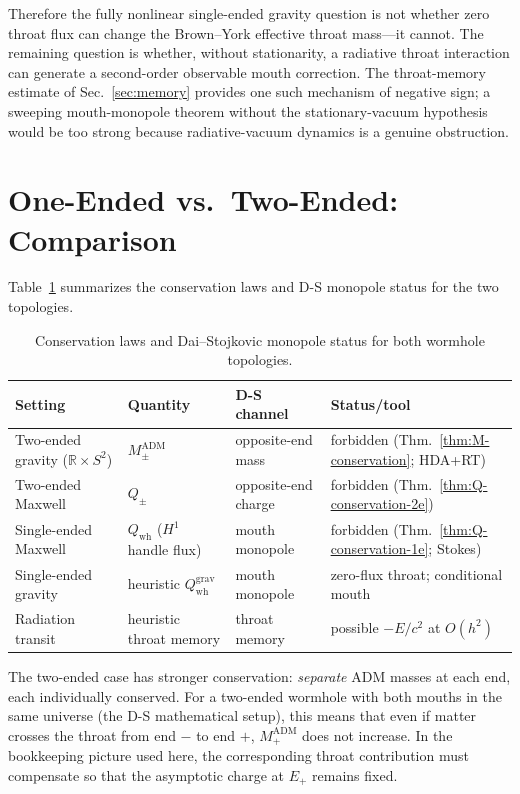 \documentclass[aps,prd,onecolumn,nofootinbib,superscriptaddress]{revtex4-2}
\begin{document}
Therefore the fully nonlinear single-ended gravity question is not whether
zero throat flux can change the Brown--York effective throat mass---it cannot.
The remaining question is whether, without stationarity, a radiative throat
interaction can generate a second-order observable mouth correction.  The
throat-memory estimate of Sec.~\ref{sec:memory} provides one such mechanism of
negative sign; a sweeping mouth-monopole theorem without the
stationary-vacuum hypothesis would be too strong because radiative-vacuum
dynamics is a genuine obstruction.

\section{One-Ended vs.\ Two-Ended: Comparison}
\label{sec:topology-comparison}

Table~\ref{tab:comparison} summarizes the conservation laws and D-S monopole
status for the two topologies.

\begin{table}[!htbp]
\centering
\small
\caption{Conservation laws and Dai--Stojkovic monopole status for both wormhole topologies.}
\label{tab:comparison}
\setlength{\tabcolsep}{5pt}
\begin{tabular}{@{}llll@{}}
\toprule
Setting & Quantity & D-S channel & Status/tool \\
\midrule
Two-ended gravity ($\mathbb{R}\times S^2$) &
$M_\pm^{\mathrm{ADM}}$ &
opposite-end mass &
forbidden (Thm.~\ref{thm:M-conservation}; HDA+RT) \\
Two-ended Maxwell &
$Q_\pm$ &
opposite-end charge &
forbidden (Thm.~\ref{thm:Q-conservation-2e}) \\
Single-ended Maxwell &
$Q_{\mathrm{wh}}$ ($H^1$ handle flux) &
mouth monopole &
forbidden (Thm.~\ref{thm:Q-conservation-1e}; Stokes) \\
Single-ended gravity &
heuristic $Q_{\mathrm{wh}}^{\mathrm{grav}}$ &
mouth monopole &
zero-flux throat; conditional mouth \\
Radiation transit &
heuristic throat memory &
throat memory &
possible $-E/c^2$ at $O(h^2)$ \\
\bottomrule
\end{tabular}
\end{table}

The two-ended case has stronger conservation: \emph{separate} ADM masses at
each end, each individually conserved.  For a two-ended wormhole with both
mouths in the same universe (the D-S mathematical setup), this means that even
if matter crosses the throat from end $-$ to end $+$, $M_+^{\mathrm{ADM}}$
does not increase.  In the bookkeeping picture used here, the corresponding
throat contribution must compensate so that the asymptotic charge at $E_+$
remains fixed.
\end{document}
